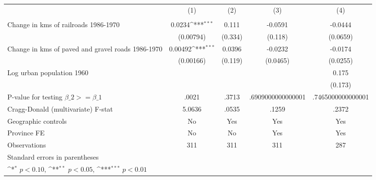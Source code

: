 {
\def\sym#1{\ifmmode^{#1}\else\(^{#1}\)\fi}
\begin{tabular}{l*{4}{c}}
\hline\hline
                &\multicolumn{1}{c}{(1)}&\multicolumn{1}{c}{(2)}&\multicolumn{1}{c}{(3)}&\multicolumn{1}{c}{(4)}\\
                &\multicolumn{1}{c}{}&\multicolumn{1}{c}{}&\multicolumn{1}{c}{}&\multicolumn{1}{c}{}\\
\hline
Change in kms of railroads 1986-1970&   0.0234\sym{***}&    0.111         &  -0.0591         &  -0.0444         \\
                &(0.00794)         &  (0.334)         &  (0.118)         & (0.0659)         \\
[1em]
Change in kms of paved and gravel roads 1986-1970&  0.00492\sym{***}&   0.0396         &  -0.0232         &  -0.0174         \\
                &(0.00166)         &  (0.119)         & (0.0465)         & (0.0255)         \\
[1em]
Log urban population 1960&                  &                  &                  &    0.175         \\
                &                  &                  &                  &  (0.173)         \\
\hline
P-value for testing $\beta\_{2} >= \beta\_{1}$&    .0021         &    .3713         &.6909000000000001         &.7465000000000001         \\
Cragg-Donald (multivariate) F-stat&   5.0636         &    .0535         &    .1259         &    .2372         \\
Geographic controls&       No         &      Yes         &      Yes         &      Yes         \\
Province FE     &       No         &       No         &      Yes         &      Yes         \\
Observations    &      311         &      311         &      311         &      287         \\
\hline\hline
\multicolumn{5}{l}{\footnotesize Standard errors in parentheses}\\
\multicolumn{5}{l}{\footnotesize \sym{*} \(p<0.10\), \sym{**} \(p<0.05\), \sym{***} \(p<0.01\)}\\
\end{tabular}
}
